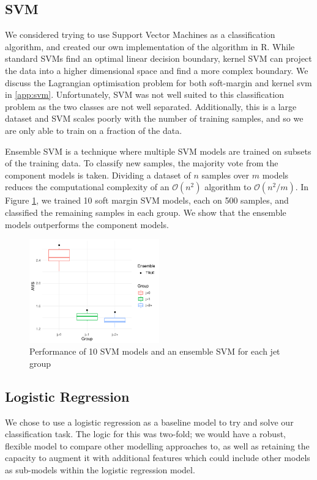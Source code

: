 \subsection{SVM}
We considered trying to use Support Vector Machines as a classification algorithm, and created our own implementation of the algorithm in R. While standard SVMs find an optimal linear decision boundary, kernel SVM can project the data into a higher dimensional space and find a more complex boundary. We discuss the Lagrangian optimisation problem for both soft-margin and kernel svm in \ref{app:svm}. Unfortunately, SVM was not well suited to this classification problem as the two classes are not well separated. Additionally, this is a large dataset and SVM scales poorly with the number of training samples, and so we are only able to train on a fraction of the data.

Ensemble SVM is a technique where multiple SVM models are trained on subsets of the training data. To classify new samples, the majority vote from the component models is taken. Dividing a dataset of $n$ samples over $m$ models reduces the computational complexity of an $\mathcal{O}(n^2)$ algorithm to $\mathcal{O}(n^2/m)$. In Figure \ref{fig:svm}, we trained 10 soft margin SVM models, each on 500 samples, and classified the remaining samples in each group. We show that the ensemble models outperforms the component models. 

\begin{figure}[h]
    \centering
	\includegraphics[width=0.5\textwidth]{Ensemble_SVM.pdf}
    \caption{Performance of 10 SVM models and an ensemble SVM for each jet group}
    \label{fig:svm}
\end{figure}

\subsection{Logistic Regression}
We chose to use a logistic regression as a baseline model to try and solve our classification task. The logic for this was two-fold; we would have a robust, flexible model to compare other modelling approaches to, as well as retaining the capacity to augment it with additional features which could include other models as sub-models within the logistic regression model. 

